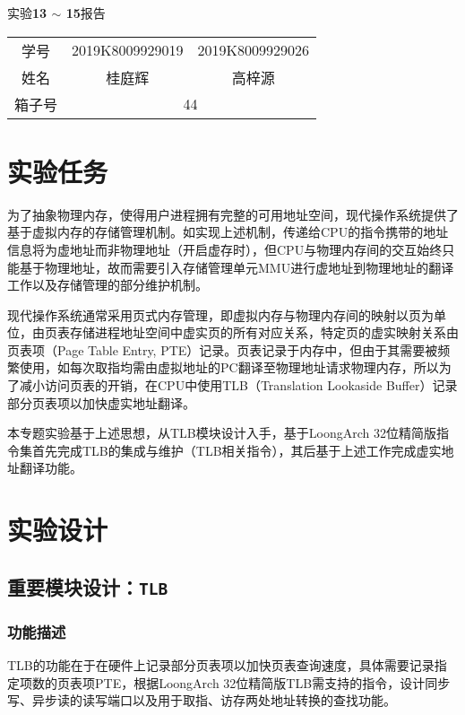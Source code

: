 \documentclass[UTF-8,twoside,c5size]{ctexart}
\begin{document}
	\begin{center}
		\heiti{}
		实验\textbf{13 $ \bm\sim $ 15}报告
	\end{center}

	\begin{table*}[!h]
		\raggedleft
		\begin{tabular}{ccc}
			{\heiti 学号} & {2019K8009929019} & {2019K8009929026} \\
			{\heiti 姓名} & 桂庭辉 & 高梓源 \\
			{\heiti 箱子号} & \multicolumn{2}{c}{44}
		\end{tabular}
	\end{table*}
	
	\section{实验任务}
    为了抽象物理内存，使得用户进程拥有完整的可用地址空间，现代操作系统提供了基于虚拟内存的存储管理机制。如实现上述机制，传递给CPU的指令携带的地址信息将为虚地址而非物理地址（开启虚存时），但CPU与物理内存间的交互始终只能基于物理地址，故而需要引入存储管理单元MMU进行虚地址到物理地址的翻译工作以及存储管理的部分维护机制。
    
    现代操作系统通常采用页式内存管理，即虚拟内存与物理内存间的映射以页为单位，由页表存储进程地址空间中虚实页的所有对应关系，特定页的虚实映射关系由页表项（Page Table Entry, PTE）记录。页表记录于内存中，但由于其需要被频繁使用，如每次取指均需由虚拟地址的PC翻译至物理地址请求物理内存，所以为了减小访问页表的开销，在CPU中使用TLB（Translation Lookaside Buffer）记录部分页表项以加快虚实地址翻译。
    
    本专题实验基于上述思想，从TLB模块设计入手，基于LoongArch 32位精简版指令集首先完成TLB的集成与维护（TLB相关指令），其后基于上述工作完成虚实地址翻译功能。
	
	\section{实验设计}	
	\subsection{重要模块设计：\texttt{TLB}}
    \subsubsection{功能描述}
    TLB的功能在于在硬件上记录部分页表项以加快页表查询速度，具体需要记录指定项数的页表项PTE，根据LoongArch 32位精简版TLB需支持的指令，设计同步写、异步读的读写端口以及用于取指、访存两处地址转换的查找功能。
    
\end{document}
